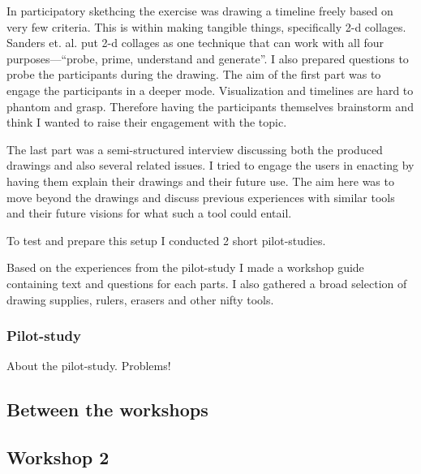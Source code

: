 \documentclass[11pt,UKenglish, a4paper]{article}
\begin{document}
In participatory skethcing the exercise was drawing a timeline freely based on very few criteria. This is within making tangible things, specifically 2-d collages. Sanders et. al. put 2-d collages as one technique that can work with all four purposes---``probe, prime, understand and generate''\cite[p.3]{Sanders2010Framework}. I also prepared questions to probe the participants during the drawing. The aim of the first part was to engage the participants in a deeper mode. Visualization and timelines are hard to phantom and grasp. Therefore having the participants themselves brainstorm and think I wanted to raise their engagement with the topic.

The last part was a semi-structured interview discussing both the produced drawings and also several related issues. I tried to engage the users in enacting by having them explain their drawings and their future use. The aim here was to move beyond the drawings and discuss previous experiences with similar tools and their future visions for what such a tool could entail. 

To test and prepare this setup I conducted 2 short pilot-studies.

Based on the experiences from the pilot-study I made a workshop guide containing text and questions for each parts. I also gathered a broad selection of drawing supplies, rulers, erasers and other nifty tools. 
\subsubsection{Pilot-study}
About the pilot-study.
Problems!

\subsection{Between the workshops}
\subsection{Workshop 2}
\end{document}
